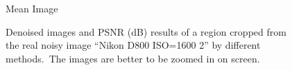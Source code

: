 \begin{figure}
{\begin{minipage}[t]{0.19\textwidth}
{\footnotesize Mean Image }
\end{minipage}
}
    \caption{Denoised images and PSNR (dB) results of a region cropped from the real noisy image ``Nikon D800 ISO=1600 2'' \cite{crosschannel2016} by different methods.\ The images are better to be zoomed in on screen.}
    \label{fig4-15}
\end{figure}

\begin{figure}
    \centering
{}
\end{figure}

